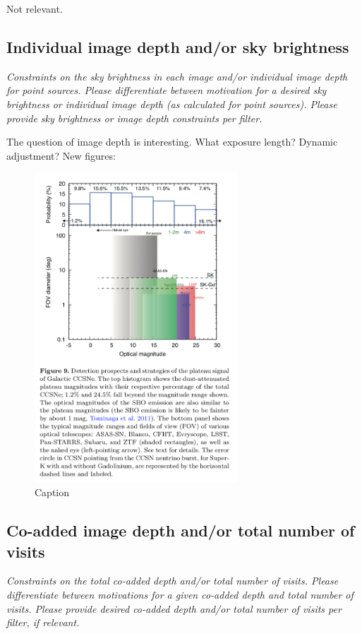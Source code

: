 \documentclass[11pt]{article}
\begin{document}
Not relevant.

\subsection{Individual image depth and/or sky brightness}
\begin{footnotesize}{\it Constraints on the sky brightness in each image and/or individual image depth for point sources.
Please differentiate between motivation for a desired sky brightness or individual image depth (as 
calculated for point sources). Please provide sky brightness or image depth constraints per filter.}
\end{footnotesize}

The question of image depth is interesting.  What exposure length?
Dynamic adjustment?  New figures:

\begin{figure}
  \begin{center}
    \includegraphics[width=3.0in]{multimessenger-comparison}
    \caption{Caption}
    \label{fig:multimessenger-comparison}
  \end{center}
\end{figure}

\subsection{Co-added image depth and/or total number of visits}
\begin{footnotesize}{\it  Constraints on the total co-added depth and/or total number of visits.
Please differentiate between motivations for a given co-added depth and total number of visits. 
Please provide desired co-added depth and/or total number of visits per filter, if relevant.}
\end{footnotesize}
\end{document}
